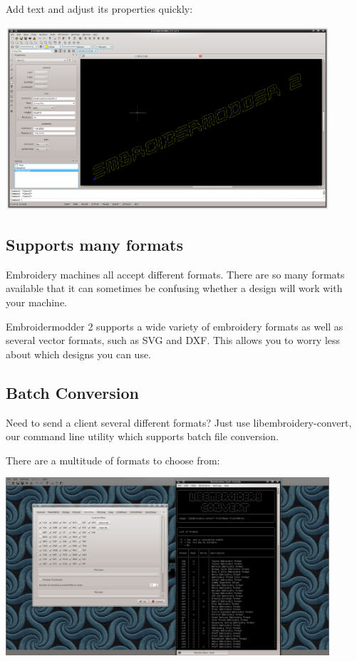 Add text and adjust its properties quickly:

\includegraphics[width=0.9\textwidth]{images/features-text-1.png}

\subsection{Supports many formats}

Embroidery machines all accept different formats. There are so many formats available that it can sometimes be confusing whether a design will work with your machine.

Embroidermodder 2 supports a wide variety of embroidery formats as well as several vector formats, such as SVG and DXF. This allows you to worry less about which designs you can use.

\subsection{Batch Conversion}

Need to send a client several different formats? Just use libembroidery-convert, our command line utility which supports batch file conversion.

There are a multitude of formats to choose from:

\includegraphics[width=0.9\textwidth]{images/features-formats-1.png}

